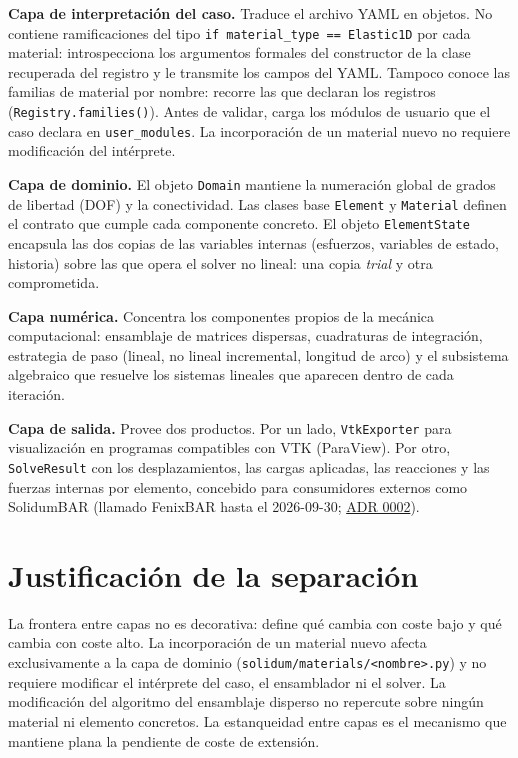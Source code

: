 \documentclass[11pt,oneside]{report}
\begin{document}
\textbf{Capa de interpretación del caso.} Traduce el archivo YAML en objetos. No contiene ramificaciones del tipo \texttt{if material\_\allowbreak{}type == \textquotedbl{}Elastic1D\textquotedbl{}} por cada material: introspecciona los argumentos formales del constructor de la clase recuperada del registro y le transmite los campos del YAML. Tampoco conoce las familias de material por nombre: recorre las que declaran los registros (\texttt{Registry.\allowbreak{}families()}). Antes de validar, carga los módulos de usuario que el caso declara en \texttt{user\_modules}. La incorporación de un material nuevo no requiere modificación del intérprete.

\textbf{Capa de dominio.} El objeto \texttt{Domain} mantiene la numeración global de grados de libertad (DOF) y la conectividad. Las clases base \texttt{Element} y \texttt{Material} definen el contrato que cumple cada componente concreto. El objeto \texttt{ElementState} encapsula las dos copias de las variables internas (esfuerzos, variables de estado, historia) sobre las que opera el solver no lineal: una copia \textit{trial} y otra comprometida.

\textbf{Capa numérica.} Concentra los componentes propios de la mecánica computacional: ensamblaje de matrices dispersas, cuadraturas de integración, estrategia de paso (lineal, no lineal incremental, longitud de arco) y el subsistema algebraico que resuelve los sistemas lineales que aparecen dentro de cada iteración.

\textbf{Capa de salida.} Provee dos productos. Por un lado, \texttt{VtkExporter} para visualización en programas compatibles con VTK (ParaView). Por otro, \texttt{SolveResult} con los desplazamientos, las cargas aplicadas, las reacciones y las fuerzas internas por elemento, concebido para consumidores externos como SolidumBAR (llamado FenixBAR hasta el 2026-09-30; \hyperref[adr:0002]{ADR 0002}).

\section{Justificación de la separación}

La frontera entre capas no es decorativa: define qué cambia con coste bajo y qué cambia con coste alto. La incorporación de un material nuevo afecta exclusivamente a la capa de dominio (\texttt{solidum/\allowbreak{}materials/\allowbreak{}\textless{}nombre\textgreater{}.\allowbreak{}py}) y no requiere modificar el intérprete del caso, el ensamblador ni el solver. La modificación del algoritmo del ensamblaje disperso no repercute sobre ningún material ni elemento concretos. La estanqueidad entre capas es el mecanismo que mantiene plana la pendiente de coste de extensión.
\end{document}
